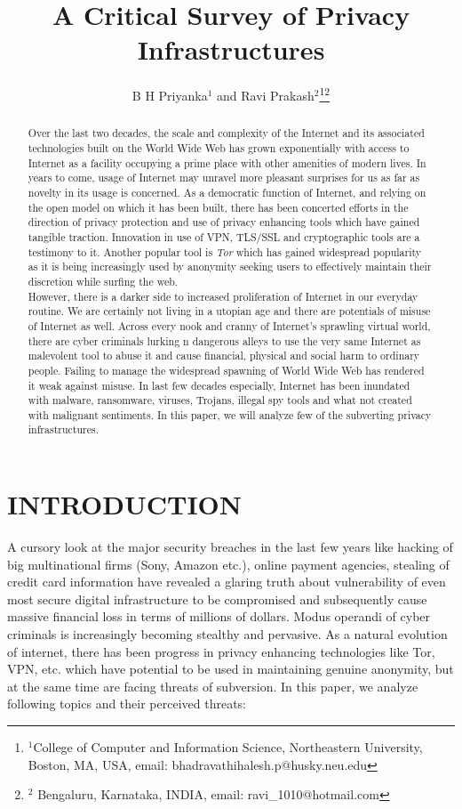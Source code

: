 \documentclass[letterpaper, 10 pt, conference]{ieeeconf}
\title{\LARGE \bf
A Critical Survey of Privacy Infrastructures
}
\author{B H Priyanka$^{1}$ and Ravi Prakash$^{2}$\thanks{$^{1}$College of Computer and Information Science, Northeastern 	         	         University, Boston, MA, USA,
              email: bhadravathihalesh.p@husky.neu.edu}\thanks{$^{2}$ Bengaluru, Karnataka, INDIA,
               email: ravi\_1010@hotmail.com}}
\begin{document}
\maketitle
\thispagestyle{empty}
\pagestyle{empty}


\begin{abstract}
Over the last two decades, the scale and complexity of the Internet and its associated technologies built on the World Wide Web has grown exponentially with access to Internet as a facility occupying a prime place with other amenities of modern lives. In years to come, usage of Internet may unravel more pleasant surprises for us as far as novelty in its usage is concerned. As a democratic function of Internet, and relying on the open model on which it has been built, there has been concerted efforts in the direction of privacy protection and use of privacy enhancing tools which have gained tangible traction. Innovation in use of VPN, TLS/SSL and cryptographic tools are a testimony to it. Another popular tool is \textit{Tor} which has gained widespread popularity as it is being increasingly used by anonymity seeking users to effectively maintain their discretion while surfing the web. \\

However, there is a darker side to increased proliferation of Internet in our everyday routine. We are certainly not living in a utopian age and there are potentials of misuse of Internet as well. Across every nook and cranny of Internet's sprawling virtual world, there are cyber criminals lurking n dangerous alleys to use the very same Internet as malevolent tool to abuse it and cause financial, physical and social harm to ordinary people. Failing to manage the widespread spawning of World Wide Web has rendered it weak against misuse. In last few decades especially, Internet has been inundated with malware, ransomware, viruses, Trojans, illegal spy tools and what not created with malignant sentiments. In this paper, we will analyze few of the subverting privacy infrastructures. \\
\end{abstract}


\section{INTRODUCTION}
A cursory look at the major security breaches in the last few years like hacking of big multinational firms (Sony, Amazon etc.), online payment agencies, stealing of credit card information have revealed a glaring truth about vulnerability of even most secure digital infrastructure to be compromised and subsequently cause massive financial loss in terms of millions of dollars. Modus operandi of cyber criminals is increasingly becoming stealthy and pervasive. As a natural evolution of internet, there has been progress in privacy enhancing technologies like Tor, VPN, etc. which have potential to be used in maintaining genuine anonymity, but at the same time are facing threats of subversion. In this paper, we analyze following topics and their perceived threats:\\
\end{document}
